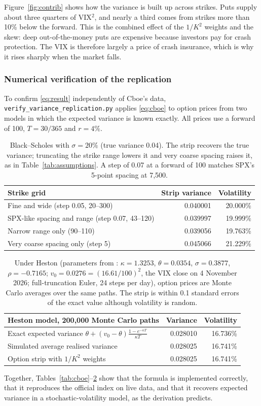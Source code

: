 Figure~\ref{fig:contrib} shows how the variance is built up across strikes. Puts supply about three quarters of VIX$^2$, and nearly a third comes from strikes more than 10\% below the forward. This is the combined effect of the $1/K^2$ weights and the skew: deep out-of-the-money puts are expensive because investors pay for crash protection. The VIX is therefore largely a price of crash insurance, which is why it rises sharply when the market falls.

\subsubsection{Numerical verification of the replication}

To confirm \eqref{eq:result} independently of Cboe's data, \texttt{verify\_variance\_replication.py} applies \eqref{eq:cboe} to option prices from two models in which the expected variance is known exactly. All prices use a forward of 100, $T=30/365$ and $r=4\%$.

\begin{table}[H]
\centering
\small
\begin{tabular}{@{}lrr@{}}
\toprule
\textbf{Strike grid} & \textbf{Strip variance} & \textbf{Volatility}\\
\midrule
Fine and wide (step 0.05, 20--300) & 0.040001 & 20.000\%\\
SPX-like spacing and range (step 0.07, 43--120) & 0.039997 & 19.999\%\\
Narrow range only (90--110) & 0.039056 & 19.763\%\\
Very coarse spacing only (step 5) & 0.045066 & 21.229\%\\
\bottomrule
\end{tabular}
\caption{Black--Scholes with $\sigma=20\%$ (true variance 0.04). The strip recovers the true variance; truncating the strike range lowers it and very coarse spacing raises it, as in Table~\ref{tab:assumptions}. A step of 0.07 at a forward of 100 matches SPX's 5-point spacing at 7,500.}
\label{tab:bs}
\end{table}

\begin{table}[H]
\centering
\small
\begin{tabular}{@{}lrr@{}}
\toprule
\textbf{Heston model, 200{,}000 Monte Carlo paths} & \textbf{Variance} & \textbf{Volatility}\\
\midrule
Exact expected variance $\theta+(v_0-\theta)\frac{1-e^{-\kappa T}}{\kappa T}$ & 0.028010 & 16.736\%\\
Simulated average realised variance & 0.028025 & 16.741\%\\
Option strip with $1/K^2$ weights & 0.028025 & 16.741\%\\
\bottomrule
\end{tabular}
\caption{Under Heston (parameters from \cite{gatheral}: $\kappa=1.3253$, $\theta=0.0354$, $\sigma=0.3877$, $\rho=-0.7165$; $v_0=0.0276=(16.61/100)^2$, the VIX close on 4 November 2026; full-truncation Euler, 24 steps per day), option prices are Monte Carlo averages over the same paths. The strip is within 0.1 standard errors of the exact value although volatility is random.}
\label{tab:heston}
\end{table}

Together, Tables~\ref{tab:cboe}--\ref{tab:heston} show that the formula is implemented correctly, that it reproduces the official index on live data, and that it recovers expected variance in a stochastic-volatility model, as the derivation predicts.
